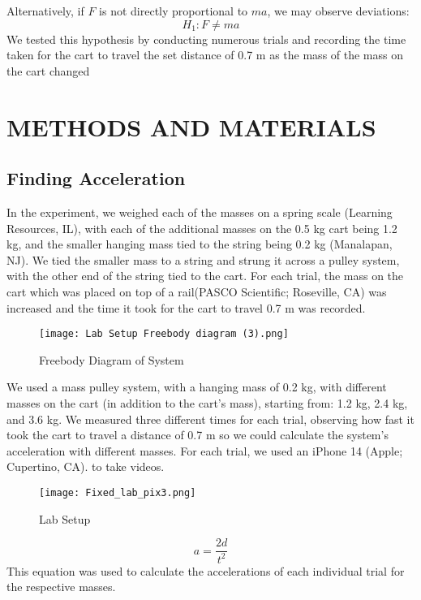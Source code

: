 \documentclass[twocolumn, 10pt]{article}
\begin{document}
Alternatively, if \( F \) is not directly proportional to \( ma \), we may observe deviations:
\begin{equation} \label{eq:3}
    H_1: F \neq ma
\end{equation}
We tested this hypothesis by conducting numerous trials and recording the time taken for the cart to travel the set distance of 0.7 m as the mass of the mass on the cart changed
\section*{METHODS AND MATERIALS}
\subsection*{Finding Acceleration}
In the experiment, we weighed each of the masses on a spring scale (Learning Resources, IL), with each of the additional masses on the 0.5 kg cart being 1.2 kg, and the smaller hanging mass tied to the string being 0.2 kg (Manalapan, NJ). We tied the smaller mass to a string and strung it across a pulley system, with the other end of the string tied to the cart. For each trial, the mass on the cart which was placed on top of a rail(PASCO Scientific; Roseville, CA) was increased and the time it took for the cart to travel 0.7 m was recorded.

\begin{figure} [H]
    \centering
    \texttt{[image: Lab Setup Freebody diagram (3).png]}
    \caption{Freebody Diagram of System}
    \label{fig:enter-label}
\end{figure}


We used a mass pulley system, with a hanging mass of 0.2 kg, with different masses on the cart (in addition to the cart's mass), starting from: 1.2 kg, 2.4 kg, and 3.6 kg. We measured three different times for each trial, observing how fast it took the cart to travel a distance of 0.7 m so we could calculate the system's acceleration with different masses. For each trial, we used an iPhone 14 (Apple; Cupertino, CA). to take videos.
\begin{figure}[H]
    \centering
    \texttt{[image: Fixed\_lab\_pix3.png]}
    \caption{Lab Setup}
    \label{fig:lab_setup}
\end{figure} 

\begin{equation} \label{eq:4}
    a = \frac{2d}{t^2} 
\end{equation}
This equation was used to calculate the accelerations of each individual trial for the respective masses. \cite{ref2}
\end{document}
